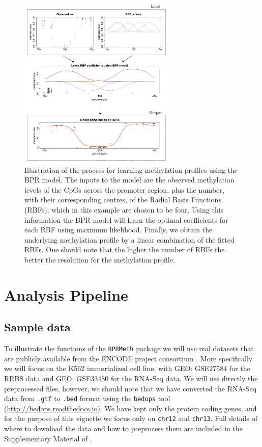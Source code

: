 \documentclass{article}\usepackage[]{graphicx}\usepackage[usenames,dvipsnames]{color}
\begin{document}
\begin{figure}[!ht]
\centerline{\includegraphics[width=0.66\textwidth]{model-bpr}}
\caption{\small{Illustration of the process for learning methylation profiles using the BPR model. The inputs to the model are the observed methylation levels of the CpGs across the promoter region, plus the number, with their corresponding centres, of the Radial Basis Functions (RBFs), which in this example are chosen to be four. Using this information the BPR model will learn the optimal coefficients for each RBF using maximum likelihood. Finally, we obtain the underlying methylation profile by a linear combination of the fitted RBFs. One should note that the higher the number of RBFs the better the resolution for the methylation profile.}}
\label{fig:model-performance}
\end{figure}


\section{Analysis Pipeline}

\subsection{Sample data}
To illustrate the functions of the \verb|BPRMeth| package we will use real datasets that are publicly available from the ENCODE project consortium \cite{Dunham2012}. More specifically we will focus on the K562 immortalized cell line, with GEO: GSE27584 for the RRBS data and GEO: GSE33480 for the RNA-Seq data. We will use directly the preprocessed files, however, we should note that we have converted the RNA-Seq data from \verb|.gtf| to \verb|.bed| format using the \verb|bedops| tool (\href{http://bedops.readthedocs.io} {http://bedops.readthedocs.io}). We have kept only the protein coding genes, and for the purpose of this vignette we focus only on \verb|chr12| and \verb|chr13|. Full details of where to download the data and how to preprocess them are included in the Supplementary Material of \cite{Kapourani2016}.
\end{document}
